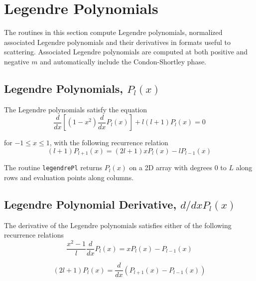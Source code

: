 
\section{Legendre Polynomials}

The routines in this section compute Legendre polynomials,  normalized associated Legendre polynomials and their derivatives in formats useful to scattering. Associated Legendre polynomials are computed at both positive and negative $m$ and automatically include the Condon-Shortley phase.  

\subsection{Legendre Polynomials, $P_l(x)$}


The Legendre polynomials satisfy the equation
\begin{equation}
\dfrac{d}{dx} \left[ (1-x^2)\dfrac{d}{dx}P_l(x)\right] + l(l+1)P_l(x) = 0
\end{equation}

for $-1 \le x \le 1$, with the following recurrence relation
\begin{equation}
(l+1)P_{l+1}(x) = (2l+1)xP_l(x) - lP_{l-1}(x) \label{plrec}
\end{equation}

The routine \texttt{legendrePl} returns $P_l(x)$ on a 2D array with degrees $0$ to $L$ along rows and evaluation points along columns.  


{\footnotesize
{}
}

\clearpage
{}
\subsection{Legendre Polynomial Derivative, $d/dx P_l(x)$}

The derivative of the Legendre polynomials satisfies either of the following recurrence relations
\begin{equation}
\dfrac{x^2-1}{l}\dfrac{d}{dx}P_l(x) = xP_l(x) - P_{l-1}(x)
\end{equation}

\begin{equation}
(2l+1)P_l(x) = \dfrac{d}{dx}(P_{l+1}(x) - P_{l-1}(x))
\end{equation}

